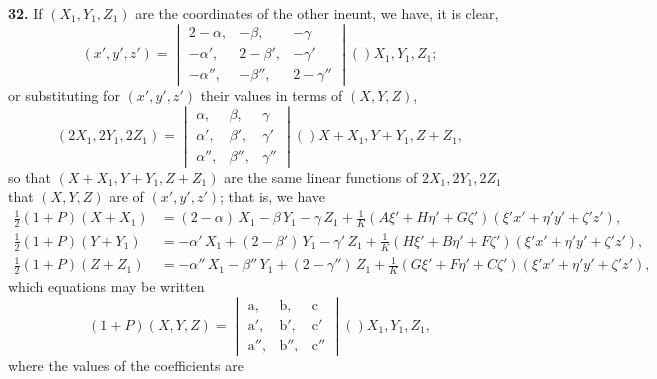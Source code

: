 \documentclass[11pt,a4paper]{book}
\providecommand{\qform}[1]{(#1)}
\begin{document}
\textbf{32.} If $(X_{1}, Y_{1}, Z_{1})$ are the coordinates of the other ineunt, we have, it is clear,
\[
(x', y', z') =
\begin{vmatrix}
2-\alpha, & -\beta, & -\gamma \\
-\alpha', & 2-\beta', & -\gamma' \\
-\alpha'', & -\beta'', & 2-\gamma''
\end{vmatrix}
\!\qform{}{X_{1}, Y_{1}, Z_{1}};
\]
or substituting for $(x', y', z')$ their values in terms of $(X, Y, Z)$,
\[
(2X_{1}, 2Y_{1}, 2Z_{1}) =
\begin{vmatrix}
\alpha, & \beta, & \gamma \\
\alpha', & \beta', & \gamma' \\
\alpha'', & \beta'', & \gamma''
\end{vmatrix}
\!\qform{}{X+X_{1}, Y+Y_{1}, Z+Z_{1}},
\]
so that $(X+X_{1}, Y+Y_{1}, Z+Z_{1})$ are the same linear functions of $2X_{1}, 2Y_{1}, 2Z_{1}$ that $(X, Y, Z)$ are of $(x', y', z')$; that is, we have
\begin{align*}
\tfrac{1}{2}(1+P)(X+X_{1}) &= (2-\alpha)\,X_{1} - \beta\,Y_{1} - \gamma\,Z_{1}
+ \tfrac{1}{K}(A\xi' + H\eta' + G\zeta')(\xi'x' + \eta'y' + \zeta'z'),\\
\tfrac{1}{2}(1+P)(Y+Y_{1}) &= -\alpha'\,X_{1} + (2-\beta')\,Y_{1} - \gamma'\,Z_{1}
+ \tfrac{1}{K}(H\xi' + B\eta' + F\zeta')(\xi'x' + \eta'y' + \zeta'z'),\\
\tfrac{1}{2}(1+P)(Z+Z_{1}) &= -\alpha''\,X_{1} - \beta''\,Y_{1} + (2-\gamma'')\,Z_{1}
+ \tfrac{1}{K}(G\xi' + F\eta' + C\zeta')(\xi'x' + \eta'y' + \zeta'z'),
\end{align*}
which equations may be written
\[
(1+P)(X, Y, Z) =
\begin{vmatrix}
\mathrm{a}, & \mathrm{b}, & \mathrm{c} \\
\mathrm{a}', & \mathrm{b}', & \mathrm{c}' \\
\mathrm{a}'', & \mathrm{b}'', & \mathrm{c}''
\end{vmatrix}
\!\qform{}{X_{1}, Y_{1}, Z_{1}},
\]
where the values of the coefficients are
\end{document}
